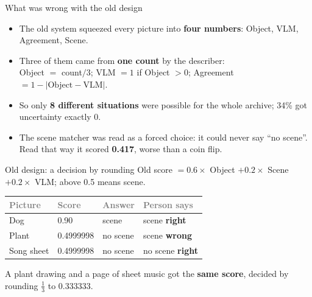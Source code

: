\documentclass[aspectratio=169,11pt]{beamer}
\newcommand{\yes}[1]{\textcolor{accent}{\textbf{#1}}}
\newcommand{\no}[1]{\textcolor{warn}{\textbf{#1}}}
\newcommand{\h}[1]{\textcolor{grey}{#1}}
\newcommand{\remark}[1]{\par\vspace{0.35cm}{\small\textcolor{grey}{#1}}}
\begin{document}
\begin{frame}{What was wrong with the old design}
\begin{itemize}\setlength\itemsep{9pt}
  \item The old system squeezed every picture into \textbf{four numbers}: Object, VLM, Agreement, Scene.
  \item Three of them came from \textbf{one count} by the describer:\\
        Object $=$ count$/3$; VLM $= 1$ if Object $> 0$; Agreement $= 1 - |\text{Object} - \text{VLM}|$.
  \item So only \textbf{8 different situations} were possible for the whole archive; 34\% got uncertainty exactly 0.
  \item The scene matcher was read as a forced choice: it could never say ``no scene''. Read that way it scored \textbf{0.417}, worse than a coin flip.
\end{itemize}
\remark{Like four witnesses where three only repeat the first one: their agreement tells you nothing new.}
\end{frame}

\begin{frame}{Old design: a decision by rounding}
Old score $= 0.6 \times$ Object $+ 0.2 \times$ Scene $+ 0.2 \times$ VLM; above 0.5 means scene.

\vspace{0.4cm}
\begin{tabular}{@{}L{2.6cm} L{3cm} L{2.4cm} L{4cm}@{}}
\toprule
\h{Picture} & \h{Score} & \h{Answer} & \h{Person says}\\
\midrule
Dog & 0.90 & scene & scene \yes{right}\\
Plant & 0.4999998 & no scene & scene \no{wrong}\\
Song sheet & 0.4999998 & no scene & no scene \yes{right}\\
\bottomrule
\end{tabular}

\vspace{0.5cm}
A plant drawing and a page of sheet music got the \textbf{same score}, decided by rounding $\tfrac{1}{3}$ to 0.333333.
\end{frame}
\end{document}
